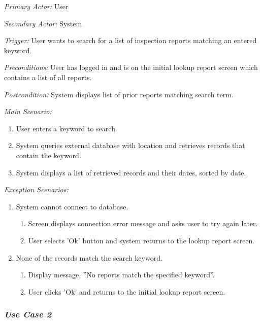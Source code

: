 \documentclass[twoside,letterpaper]{article}
\begin{document}
{\color{black} \textit{Primary Actor:} User}

{\color{black} \textit{Secondary Actor:} System}

{\color{black} \textit{Trigger:} User wants to search for a list of inspection reports matching an entered keyword.}

{\color{black} \textit{Preconditions:} User has logged in and is on the initial lookup report screen which contains a list of all reports.}

{\color{black} \textit{Postcondition:} System displays list of prior reports matching search term.}
\newline

{\color{black} \textit{Main Scenario:}}
\begin{enumerate}
\item User enters a keyword to search.
\item System queries external database with location and retrieves records that contain the keyword.
\item System displays a list of retrieved records and their dates, sorted by date.
\end{enumerate}

{\color{black} \textit{Exception Scenarios:}}
\begin{enumerate}
\item System cannot connect to database.
\begin{enumerate}
\item Screen displays connection error message and asks user to try again later.
\item User selects 'Ok' button and system returns to the lookup report screen.
\end{enumerate}

\item None of the records match the search keyword.
\begin{enumerate}
\item Display message, ''No reports match the specified keyword''.
\item User clicks 'Ok' and returns to the initial lookup report screen.
\end{enumerate}
\end{enumerate}

\subsubsection{\textit{Use Case 2}}
\end{document}
